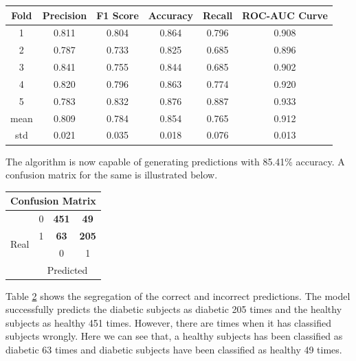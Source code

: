 \documentclass[12pt]{article}
\begin{document}
{
\centering
\begin{table}[ht]
\centering
\begin{tabular}{|c|c|c|c|c|c|}
\hline
Fold & Precision & F1 Score & Accuracy & Recall & ROC-AUC Curve \\ \hline
1    & 0.811     & 0.804    & 0.864    & 0.796  & 0.908         \\ \hline
2    & 0.787     & 0.733    & 0.825    & 0.685  & 0.896         \\ \hline
3    & 0.841     & 0.755    & 0.844    & 0.685  & 0.902         \\ \hline
4    & 0.820     & 0.796    & 0.863    & 0.774  & 0.920         \\ \hline
5    & 0.783     & 0.832    & 0.876    & 0.887  & 0.933         \\ \hline
mean & 0.809     & 0.784    & 0.854    & 0.765  & 0.912         \\ \hline
std  & 0.021     & 0.035    & 0.018    & 0.076  & 0.013         \\ \hline
\end{tabular}
\label{table:7}
\end{table}
}

The algorithm is now capable of generating predictions with 85.41\% accuracy. A confusion matrix for the same is illustrated below.

\begin{table}[ht]
\centering
\begin{tabular}{|c|c|c|c|}
\hline
\multicolumn{4}{|c|}{Confusion Matrix}                  \\ \hline
\multirow{4}{*}{Real} & 0 & \textbf{451} & \textbf{49}  \\ \cline{2-4} 
                      & 1 & \textbf{63}  & \textbf{205} \\ \cline{2-4} 
                      &   & 0            & 1            \\ \cline{2-4} 
                      & \multicolumn{3}{c|}{Predicted}  \\ \hline
\end{tabular}
\label{table:14}
\end{table}


Table \ref{table:14} shows the segregation of the correct and incorrect predictions. The model successfully  predicts the diabetic subjects as diabetic 205 times and the healthy subjects as healthy 451 times. However, there are times when it has classified subjects wrongly. Here we can see that, a healthy subjects has been classified as diabetic 63 times and diabetic subjects have been classified as healthy 49 times.
\end{document}
